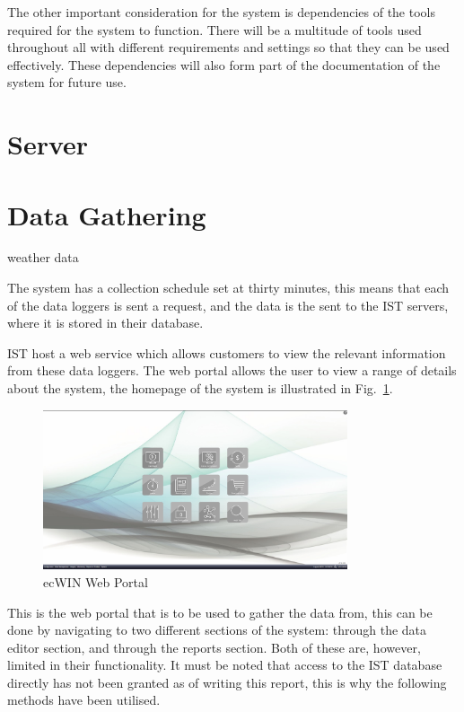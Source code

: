 \documentclass[12pt,onecolumn]{IEEEtran}
\begin{document}
The other important consideration for the system is dependencies of the tools required for the system to function. There will be a multitude of tools used throughout all with different requirements and settings so that they can be used effectively. These dependencies will also form part of the documentation of the system for future use.

\section{Server} \label{sec:Server}
\section{Data Gathering} \label{sec:DataGathering}
weather data

The system has a collection schedule set at thirty minutes, this means that each of the data loggers is sent a request, and the data is the sent to the IST servers, where it is stored in their database. 


IST host a web service which allows customers to view the relevant information from these data loggers. 
The web portal allows the user to view a range of details about the system, the homepage of the system is illustrated in Fig.~\ref{fig:ecwin}.

\begin{center}
    \begin{figure}[htb]
        \centering
        \includegraphics[width=0.8\textwidth]{ecwin.png}
        \caption{ecWIN Web Portal}
        \label{fig:ecwin}
    \end{figure}
\end{center}

This is the web portal that is to be used to gather the data from, this can be done by navigating to two different sections of the system: through the data editor section, and through the reports section. Both of these are, however, limited in their functionality. It must be noted that access to the IST database directly has not been granted as of writing this report, this is why the following methods have been utilised.
\end{document}
